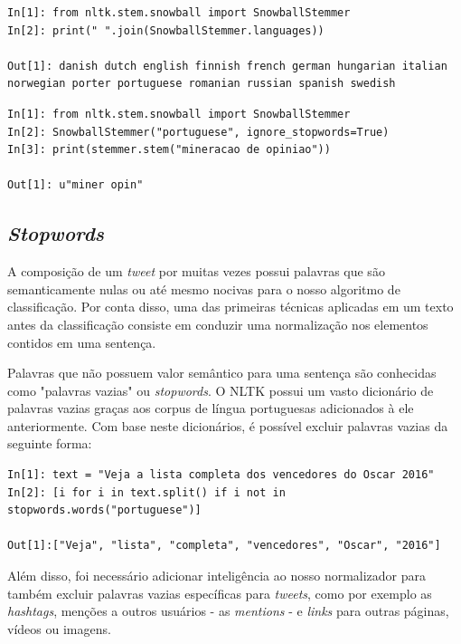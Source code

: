 \begin{lstlisting}[style=python, frame=single]
In[1]: from nltk.stem.snowball import SnowballStemmer
In[2]: print(" ".join(SnowballStemmer.languages))

Out[1]: danish dutch english finnish french german hungarian italian
norwegian porter portuguese romanian russian spanish swedish
\end{lstlisting}



\begin{lstlisting}[style=python, frame=single]
In[1]: from nltk.stem.snowball import SnowballStemmer
In[2]: SnowballStemmer("portuguese", ignore_stopwords=True)
In[3]: print(stemmer.stem("mineracao de opiniao"))

Out[1]: u"miner opin"
\end{lstlisting}


\subsection{\textit{Stopwords}}

A composição de um \textit{tweet} por muitas vezes possui palavras que são semanticamente nulas ou até mesmo nocivas para o nosso algoritmo de classificação. Por conta disso, uma das primeiras técnicas aplicadas em um texto antes da classificação consiste em conduzir uma normalização nos elementos contidos em uma sentença.

Palavras que não possuem valor semântico para uma sentença são conhecidas como "palavras vazias" ou \textit{stopwords}. O NLTK possui um vasto dicionário de palavras vazias graças aos corpus de língua portuguesas adicionados à ele anteriormente. Com base neste dicionários, é possível excluir palavras vazias da seguinte forma:

\begin{lstlisting}[style=python, frame=single]
In[1]: text = "Veja a lista completa dos vencedores do Oscar 2016"
In[2]: [i for i in text.split() if i not in stopwords.words("portuguese")]

Out[1]:["Veja", "lista", "completa", "vencedores", "Oscar", "2016"]
\end{lstlisting}

Além disso, foi necessário adicionar inteligência ao nosso normalizador para também excluir palavras vazias específicas para \textit{tweets}, como por exemplo as \textit{hashtags}, menções a outros usuários - as \textit{mentions} - e \textit{links} para outras páginas, vídeos ou imagens.

